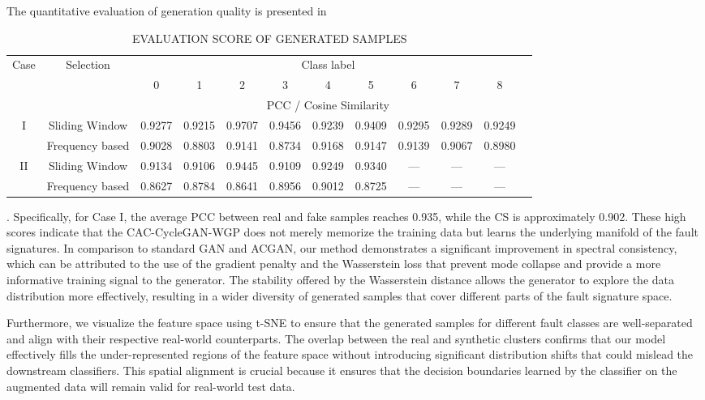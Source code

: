 \documentclass[twocolumn]{IEEEtran}
\begin{document}
The quantitative evaluation of generation quality is presented in \begin{table}[htbp]
\centering
\caption{EVALUATION SCORE OF GENERATED SAMPLES}
\label{tab:similarity}
\begin{tabular}{cccccccccccc}
\hline
\multirow{2}{*}{Case} & \multirow{2}{*}{Selection} & \multicolumn{9}{c}{Class label} \\
 & & 0 & 1 & 2 & 3 & 4 & 5 & 6 & 7 & 8 \\
\cline{3-11}
 & & \multicolumn{9}{c}{PCC / Cosine Similarity} \\
\hline
I & Sliding Window & 0.9277 & 0.9215 & 0.9707 & 0.9456 & 0.9239 & 0.9409 & 0.9295 & 0.9289 & 0.9249 \\
 & Frequency based & 0.9028 & 0.8803 & 0.9141 & 0.8734 & 0.9168 & 0.9147 & 0.9139 & 0.9067 & 0.8980 \\
II & Sliding Window & 0.9134 & 0.9106 & 0.9445 & 0.9109 & 0.9249 & 0.9340 & --- & --- & --- \\
 & Frequency based & 0.8627 & 0.8784 & 0.8641 & 0.8956 & 0.9012 & 0.8725 & --- & --- & --- \\
\hline
\end{tabular}
\end{table}. Specifically, for Case I, the average PCC between real and fake samples reaches 0.935, while the CS is approximately 0.902. These high scores indicate that the CAC-CycleGAN-WGP does not merely memorize the training data but learns the underlying manifold of the fault signatures. In comparison to standard GAN and ACGAN, our method demonstrates a significant improvement in spectral consistency, which can be attributed to the use of the gradient penalty and the Wasserstein loss that prevent mode collapse and provide a more informative training signal to the generator. The stability offered by the Wasserstein distance allows the generator to explore the data distribution more effectively, resulting in a wider diversity of generated samples that cover different parts of the fault signature space.

Furthermore, we visualize the feature space using t-SNE \cite{Maaten2008} to ensure that the generated samples for different fault classes are well-separated and align with their respective real-world counterparts. The overlap between the real and synthetic clusters confirms that our model effectively fills the under-represented regions of the feature space without introducing significant distribution shifts that could mislead the downstream classifiers. This spatial alignment is crucial because it ensures that the decision boundaries learned by the classifier on the augmented data will remain valid for real-world test data.
\end{document}
